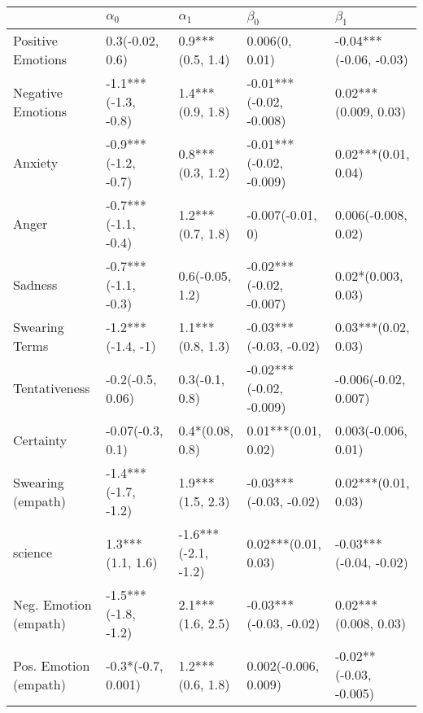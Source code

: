 \begin{tabular}{lllll}
\toprule
{} &           $\alpha_0$ &           $\alpha_1$ &                $\beta_0$ &               $\beta_1$ \\
\midrule
Positive Emotions     &      0.3(-0.02, 0.6) &     0.9***(0.5, 1.4) &           0.006(0, 0.01) &  -0.04***(-0.06, -0.03) \\
Negative Emotions     &  -1.1***(-1.3, -0.8) &     1.4***(0.9, 1.8) &  -0.01***(-0.02, -0.008) &    0.02***(0.009, 0.03) \\
Anxiety               &  -0.9***(-1.2, -0.7) &     0.8***(0.3, 1.2) &  -0.01***(-0.02, -0.009) &     0.02***(0.01, 0.04) \\
Anger                 &  -0.7***(-1.1, -0.4) &     1.2***(0.7, 1.8) &         -0.007(-0.01, 0) &     0.006(-0.008, 0.02) \\
Sadness               &  -0.7***(-1.1, -0.3) &      0.6(-0.05, 1.2) &  -0.02***(-0.02, -0.007) &      0.02*(0.003, 0.03) \\
Swearing Terms        &    -1.2***(-1.4, -1) &     1.1***(0.8, 1.3) &   -0.03***(-0.03, -0.02) &     0.03***(0.02, 0.03) \\
Tentativeness         &     -0.2(-0.5, 0.06) &       0.3(-0.1, 0.8) &  -0.02***(-0.02, -0.009) &    -0.006(-0.02, 0.007) \\
Certainty             &     -0.07(-0.3, 0.1) &      0.4*(0.08, 0.8) &      0.01***(0.01, 0.02) &     0.003(-0.006, 0.01) \\
Swearing (empath)     &  -1.4***(-1.7, -1.2) &     1.9***(1.5, 2.3) &   -0.03***(-0.03, -0.02) &     0.02***(0.01, 0.03) \\
science               &     1.3***(1.1, 1.6) &  -1.6***(-2.1, -1.2) &      0.02***(0.01, 0.03) &  -0.03***(-0.04, -0.02) \\
Neg. Emotion (empath) &  -1.5***(-1.8, -1.2) &     2.1***(1.6, 2.5) &   -0.03***(-0.03, -0.02) &    0.02***(0.008, 0.03) \\
Pos. Emotion (empath) &   -0.3*(-0.7, 0.001) &     1.2***(0.6, 1.8) &     0.002(-0.006, 0.009) &  -0.02**(-0.03, -0.005) \\
\bottomrule
\end{tabular}
